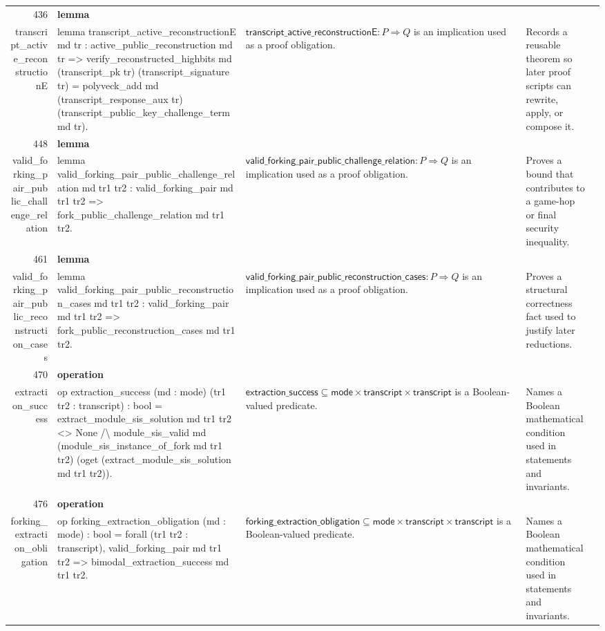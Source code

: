 \documentclass[10pt]{article}
\newcommand{\ec}[1]{\begingroup\ttfamily\scriptsize #1\endgroup}
\begin{document}
\begin{longtable}{r L{0.17\textwidth} L{0.26\textwidth} L{0.27\textwidth} L{0.20\textwidth}}
436 & \textbf{lemma}\\\ec{transcript\_active\_reconstructionE} & \ec{lemma transcript\_active\_reconstructionE md tr : active\_public\_reconstruction md tr => verify\_reconstructed\_highbits md (transcript\_pk tr) (transcript\_signature tr) = polyveck\_add md (transcript\_response\_aux tr) (transcript\_public\_key\_challenge\_term md tr).} & \(\mathsf{transcript\_active\_reconstructionE} : P \Rightarrow Q\) is an implication used as a proof obligation. & Records a reusable theorem so later proof scripts can rewrite, apply, or compose it. \\
448 & \textbf{lemma}\\\ec{valid\_forking\_pair\_public\_challenge\_relation} & \ec{lemma valid\_forking\_pair\_public\_challenge\_relation md tr1 tr2 : valid\_forking\_pair md tr1 tr2 => fork\_public\_challenge\_relation md tr1 tr2.} & \(\mathsf{valid\_forking\_pair\_public\_challenge\_relation} : P \Rightarrow Q\) is an implication used as a proof obligation. & Proves a bound that contributes to a game-hop or final security inequality. \\
461 & \textbf{lemma}\\\ec{valid\_forking\_pair\_public\_reconstruction\_cases} & \ec{lemma valid\_forking\_pair\_public\_reconstruction\_cases md tr1 tr2 : valid\_forking\_pair md tr1 tr2 => fork\_public\_reconstruction\_cases md tr1 tr2.} & \(\mathsf{valid\_forking\_pair\_public\_reconstruction\_cases} : P \Rightarrow Q\) is an implication used as a proof obligation. & Proves a structural correctness fact used to justify later reductions. \\
470 & \textbf{operation}\\\ec{extraction\_success} & \ec{op extraction\_success (md : mode) (tr1 tr2 : transcript) : bool = extract\_module\_sis\_solution md tr1 tr2 <> None /\textbackslash{} module\_sis\_valid md (module\_sis\_instance\_of\_fork md tr1 tr2) (oget (extract\_module\_sis\_solution md tr1 tr2)).} & \(\mathsf{extraction\_success} \subseteq \mathsf{mode} \times \mathsf{transcript} \times \mathsf{transcript}\) is a Boolean-valued predicate. & Names a Boolean mathematical condition used in statements and invariants. \\
476 & \textbf{operation}\\\ec{forking\_extraction\_obligation} & \ec{op forking\_extraction\_obligation (md : mode) : bool = forall (tr1 tr2 : transcript), valid\_forking\_pair md tr1 tr2 => bimodal\_extraction\_success md tr1 tr2.} & \(\mathsf{forking\_extraction\_obligation} \subseteq \mathsf{mode} \times \mathsf{transcript} \times \mathsf{transcript}\) is a Boolean-valued predicate. & Names a Boolean mathematical condition used in statements and invariants. \\

\end{longtable}
\end{document}

